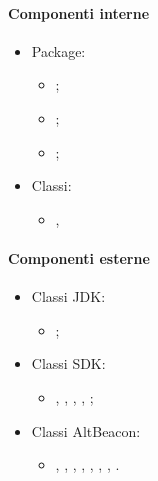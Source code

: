 \documentclass[../Funzionalita.tex]{subfiles}
\begin{document}
			\paragraph*{Componenti interne}
			\begin{itemize}
			
				\item Package:
				\begin{itemize}
					\item \model;
					\item \beacon;
					\item \dataaccess;
				\end{itemize}
				
				\item Classi: 
				\begin{itemize}
					\item \BeaconManagerAdapter, 
				\end{itemize}
												
			\end{itemize}
			
			\paragraph*{Componenti esterne}
			\begin{itemize}
			
				\item Classi JDK:
				\begin{itemize}
					\item \PriorityQueue;
				\end{itemize}
				
				\item Classi SDK:
				\begin{itemize}
					\item \Intent, \LocalBroadcastManager, \Service, \Binder, \LocalBroadcastManager;
				\end{itemize}
				
				\item Classi AltBeacon:
				\begin{itemize}
					\item \BeaconManager, \BootstrapNotifier, \BeaconConsumer, \RangeNotifier, \Region, \BeaconParser, \DistanceCalculator, \Beacon.
				\end{itemize}
				
			\end{itemize}
			
\end{document}
